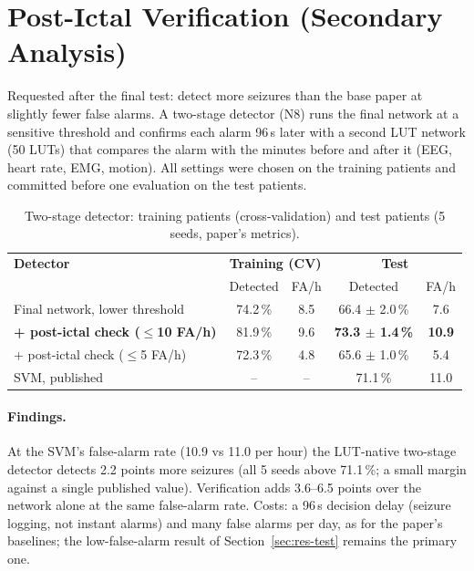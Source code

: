 \section{Post-Ictal Verification (Secondary Analysis)}\label{sec:res-n8}

Requested after the final test: detect more seizures than the base paper at slightly fewer false alarms. A two-stage
detector (N8) runs the final network at a sensitive threshold and confirms each alarm 96\,s later with a second LUT
network (50 LUTs) that compares the alarm with the minutes before and after it (EEG, heart rate, EMG, motion). All
settings were chosen on the training patients and committed before one evaluation on the test patients.

\begin{table}[H]
\centering\small
\caption[Two-stage detector with post-ictal verification.]{Two-stage detector: training patients (cross-validation) and test patients (5 seeds, paper's metrics).}\label{tab:n8}
\begin{tabular}{@{}lcccc@{}}
\toprule
\textbf{Detector} & \multicolumn{2}{c}{\textbf{Training (CV)}} & \multicolumn{2}{c}{\textbf{Test}}\\
 & Detected & FA/h & Detected & FA/h\\
\midrule
Final network, lower threshold & 74.2\,\% & 8.5 & 66.4 $\pm$ 2.0\,\% & 7.6\\
\textbf{+ post-ictal check ($\le$10 FA/h)} & 81.9\,\% & 9.6 & \textbf{73.3 $\pm$ 1.4\,\%} & \textbf{10.9}\\
+ post-ictal check ($\le$5 FA/h) & 72.3\,\% & 4.8 & 65.6 $\pm$ 1.0\,\% & 5.4\\
SVM, published \cite{bhagubai2025seizeit2} & -- & -- & 71.1\,\% & 11.0\\
\bottomrule
\end{tabular}
\end{table}

\paragraph{Findings.} At the SVM's false-alarm rate (10.9 vs 11.0 per hour) the LUT-native two-stage detector detects
2.2 points more seizures (all 5 seeds above 71.1\,\%; a small margin against a single published value). Verification
adds 3.6--6.5 points over the network alone at the same false-alarm rate. Costs: a 96\,s decision delay (seizure
logging, not instant alarms) and many false alarms per day, as for the paper's baselines; the low-false-alarm result of
Section~\ref{sec:res-test} remains the primary one.

